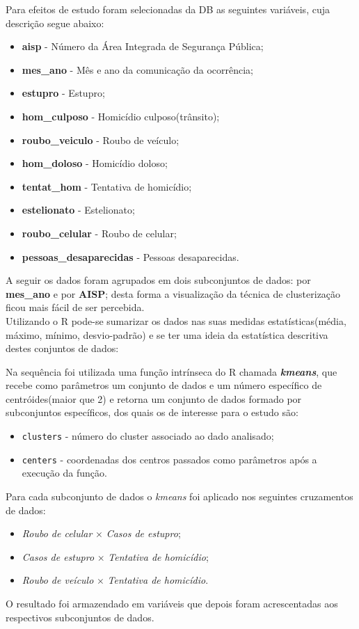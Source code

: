 \documentclass[a4paper, 12pt]{article}
\begin{document}
	\begin{multicols}{2}
		  Para efeitos de estudo foram selecionadas da DB as seguintes variáveis, cuja descrição segue abaixo:
		 	\begin{itemize}
		 		\item \textbf{aisp} - Número da Área Integrada de Segurança Pública;
		 		\item \textbf{mes\_ano} - Mês e ano da comunicação da ocorrência;
		 		\item \textbf{estupro} - Estupro;
		 		\item \textbf{hom\_culposo} - Homicídio culposo(trânsito);
		 		\item \textbf{roubo\_veiculo} - Roubo de veículo;
		 		\item \textbf{hom\_doloso} - Homicídio doloso;
		 		\item \textbf{tentat\_hom} - Tentativa de homicídio;
		 		\item \textbf{estelionato} - Estelionato;
		 		\item \textbf{roubo\_celular} - Roubo de celular;
		 		\item \textbf{pessoas\_desaparecidas} - Pessoas desaparecidas.
		 	\end{itemize}
	 	A seguir os dados foram agrupados em dois subconjuntos de dados:  por \textbf{mes\_ano} e por \textbf{AISP};  desta forma a visualização da técnica de clusterização ficou mais fácil de ser percebida. \\
		
		Utilizando o R pode-se sumarizar os dados nas suas medidas estatísticas(média, máximo, mínimo, desvio-padrão) e se ter uma ideia da estatística descritiva destes conjuntos de dados:
		
		Na sequência foi utilizada uma função intrínseca do R chamada \textit{\textbf{kmeans}}, que recebe como parâmetros um conjunto de dados e um número específico de centróides(maior que 2) e retorna um conjunto de dados formado por subconjuntos específicos, dos quais os de interesse para o estudo são:
			\begin{itemize}
				\item \texttt{clusters} - número do cluster associado ao dado analisado;
				\item \texttt{centers} - coordenadas dos centros passados como parâmetros após a execução da função.
			\end{itemize}
		
		Para cada subconjunto de dados o \textit{kmeans} foi aplicado nos seguintes cruzamentos de dados:
			\begin{itemize}
				\item \textit{Roubo de celular} $\times$ \textit{Casos de estupro};
				\item \textit{Casos de estupro} $\times$ \textit{Tentativa de homicídio};
				\item \textit{Roubo de veículo} $\times$ \textit{Tentativa de homicídio}.
			\end{itemize}
		O resultado foi armazendado em variáveis que depois foram acrescentadas aos respectivos subconjuntos de dados. \\
		

\end{multicols}
\end{document}
